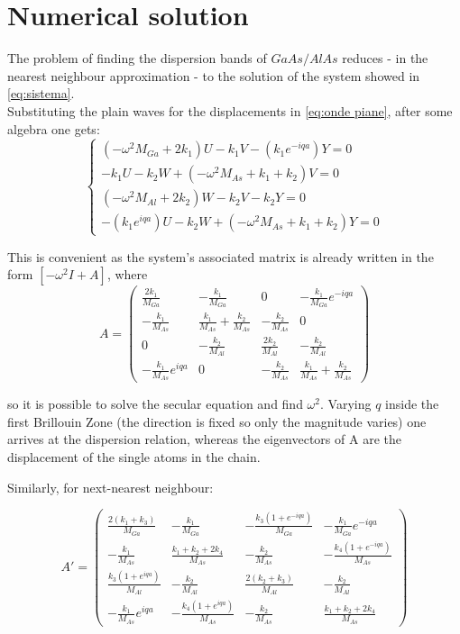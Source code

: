 \documentclass{article}
\begin{document}
\newpage
\section*{Numerical solution}
The problem of finding the dispersion bands of $GaAs/AlAs$ reduces - in the nearest neighbour approximation - to the solution of the system showed in \autoref{eq:sistema}. \\
Substituting the plain waves for the displacements in \autoref{eq:onde piane}, after some algebra one gets:
\begin{equation}
	\begin{cases}
		(-\omega^2M_{Ga} + 2k_1)U - k_1V - (k_1e^{-iqa})Y = 0 \\
		-k_1U -k_2W + (-\omega^2M_{As} + k_1 + k_2)V = 0 \\
		(-\omega^2M_{Al} + 2k_2)W -k_2V - k_2Y = 0 \\
		-(k_1e^{iqa})U - k_2W + (-\omega^2M_{As} + k_1 + k_2)Y = 0	
	\end{cases}
	\label{sist.final}
\end {equation}

This is convenient as the system's associated matrix is already written in the form $[-\omega^2I + A]$, where
\begin{equation} 
A = \begin{pmatrix}
   \frac{2k_1}{M_{Ga}}				& -\frac{k_1}{M_{Ga}}  			 & 0  			 & -\frac{k_1}{M_{Ga}}e^{-iqa}  \\ 
   -\frac{k_1}{M_{As}} 				& \frac{k_1}{M_{As}}+\frac{k_2}{M_{As}}  & -\frac{k_2}{M_{As}}    & 0  \\ 
   0						& -\frac{k_2}{M_{Al}}  			 & \frac{2k_2}{M_{Al}} 	 & -\frac{k_2}{M_{Al}}  \\ 
   -\frac{k_1}{M_{As}}e^{iqa} 			& 0 					 & -\frac{k_2}{M_{As}}    & \frac{k_1}{M_{As}}+\frac{k_2}{M_{As}}   
\end{pmatrix} 
\label{eq:matrice}
\end{equation}


so it is possible to solve the secular equation and find $\omega^2$. Varying $q$ inside the first Brillouin Zone (the direction is fixed so only the magnitude varies) one arrives at the dispersion relation, whereas the eigenvectors of A are the displacement of the single atoms in the chain.\par
Similarly, for next-nearest neighbour:

\begin{equation} 
A' = \begin{pmatrix}
	\frac{2(k_1+k_3)}{M_{Ga}}				& -\frac{k_1}{M_{Ga}}  			 & -\frac{k_3(1+e^{-iqa})}{M_{Ga}} & -\frac{k_1}{M_{Ga}}e^{-iqa}  \\ 
		-\frac{k_1}{M_{As}} 						& \frac{k_1+k_2+2k_4}{M_{As}} 				 & -\frac{k_2}{M_{As}}             & -\frac{k_4(1+e^{-iqa})}{M_{As}}\\ 
		\frac{k_3(1+e^{iqa})}{M_{Al}}				& -\frac{k_2}{M_{Al}}  		 	& \frac{2(k_2+k_3)}{M_{Al}} 	 & -\frac{k_2}{M_{Al}}  \\ 
	 -\frac{k_1}{M_{As}}e^{iqa} 			& -\frac{k_4(1+e^{iqa})}{M_{As}} 					 & -\frac{k_2}{M_{As}}    & \frac{k_1+k_2+2k_4}{M_{As}}   
\end{pmatrix} 
\label{eq:matrice}
\end{equation}
\end{document}
